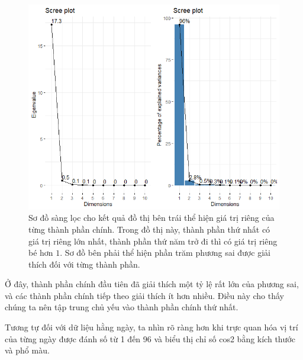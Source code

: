 \documentclass[../thesis.tex]{subfiles}
\begin{document}
\begin{figure}[H]
	\centering
	\includegraphics[width=1\linewidth]{images/Scree_plot_2_cul}
	\caption[Sơ đồ sàng lọc dữ liệu ca nhiễm hằng ngày và giá trị riêng tương ứng]{Sơ đồ sàng lọc cho kết quả đồ thị bên trái thể hiện giá trị riêng của từng thành phần chính. Trong đồ thị này, thành phần thứ nhất có giá trị riêng lớn nhất, thành phần thứ năm trở đi thì có giá trị riêng bé hơn $ 1 $. Sơ đồ bên phải thể hiện phần trăm phương sai được giải thích đối với từng thành phần. }
	\label{fig:screeplot2cul}
\end{figure}

Ở đây, thành phần chính đầu tiên đã giải thích một tỷ lệ rất lớn của phương sai, và các thành phần chính tiếp theo giải thích ít hơn nhiều. Điều này cho thấy chúng ta nên tập trung chủ yếu vào  thành phần chính thứ nhất. 

\newpage
\begin{Shaded}
	\begin{Highlighting}[]
\SpecialCharTok{\%\textgreater{}\%}\SpecialCharTok{::}
		 \NormalTok{,}
		 \NormalTok{,}
		 \NormalTok{)}
	\end{Highlighting}
\end{Shaded}

Tương tự đối với dữ liệu hằng ngày, ta nhìn rõ ràng hơn khi trực quan hóa vị trí của từng ngày được đánh số từ 1 đến 96 và biểu thị chỉ số cos2 bằng kích thước và phổ màu.
\end{document}
